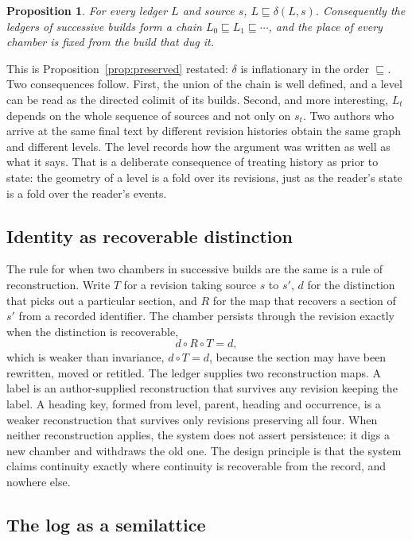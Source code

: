 \documentclass[11pt]{article}
\newtheorem{proposition}{Proposition}
\theoremstyle{remark}
\begin{document}
\begin{proposition}
\label{prop:chain}
For every ledger $L$ and source $s$, $L \sqsubseteq \delta(L, s)$. Consequently the ledgers of successive builds form a chain $L_0 \sqsubseteq L_1 \sqsubseteq \cdots$, and the place of every chamber is fixed from the build that dug it.
\end{proposition}

This is Proposition~\ref{prop:preserved} restated: $\delta$ is inflationary in the order $\sqsubseteq$. Two consequences follow. First, the union of the chain is well defined, and a level can be read as the directed colimit of its builds. Second, and more interesting, $L_t$ depends on the whole sequence of sources and not only on $s_t$. Two authors who arrive at the same final text by different revision histories obtain the same graph and different levels. The level records how the argument was written as well as what it says. That is a deliberate consequence of treating history as prior to state: the geometry of a level is a fold over its revisions, just as the reader's state is a fold over the reader's events.

\subsection{Identity as recoverable distinction}

The rule for when two chambers in successive builds are the same is a rule of reconstruction. Write $T$ for a revision taking source $s$ to $s'$, $d$ for the distinction that picks out a particular section, and $R$ for the map that recovers a section of $s'$ from a recorded identifier. The chamber persists through the revision exactly when the distinction is recoverable,
\[
d \circ R \circ T = d,
\]
which is weaker than invariance, $d \circ T = d$, because the section may have been rewritten, moved or retitled. The ledger supplies two reconstruction maps. A label is an author-supplied reconstruction that survives any revision keeping the label. A heading key, formed from level, parent, heading and occurrence, is a weaker reconstruction that survives only revisions preserving all four. When neither reconstruction applies, the system does not assert persistence: it digs a new chamber and withdraws the old one. The design principle is that the system claims continuity exactly where continuity is recoverable from the record, and nowhere else.

\subsection{The log as a semilattice}
\end{document}
